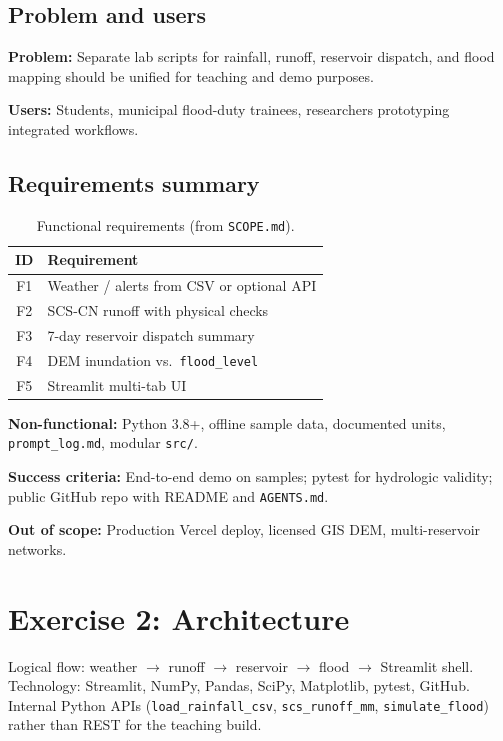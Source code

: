 \documentclass[11pt,a4paper]{article}
\begin{document}
\subsection{Problem and users}
\textbf{Problem:} Separate lab scripts for rainfall, runoff, reservoir dispatch, and flood mapping should be unified for teaching and demo purposes.

\textbf{Users:} Students, municipal flood-duty trainees, researchers prototyping integrated workflows.

\subsection{Requirements summary}
\begin{table}[htbp]
  \centering
  \caption{Functional requirements (from \texttt{SCOPE.md}).}
  \label{tab:func}
  \small
  \begin{tabular}{@{}cl@{}}
    \toprule
    ID & Requirement \\
    \midrule
    F1 & Weather / alerts from CSV or optional API \\
    F2 & SCS-CN runoff with physical checks \\
    F3 & 7-day reservoir dispatch summary \\
    F4 & DEM inundation vs.\ \texttt{flood\_level} \\
    F5 & Streamlit multi-tab UI \\
    \bottomrule
  \end{tabular}
\end{table}

\textbf{Non-functional:} Python 3.8+, offline sample data, documented units, \texttt{prompt\_log.md}, modular \texttt{src/}.

\textbf{Success criteria:} End-to-end demo on samples; pytest for hydrologic validity; public GitHub repo with README and \texttt{AGENTS.md}.

\textbf{Out of scope:} Production Vercel deploy, licensed GIS DEM, multi-reservoir networks.

\section{Exercise 2: Architecture}

Logical flow: weather $\rightarrow$ runoff $\rightarrow$ reservoir $\rightarrow$ flood $\rightarrow$ Streamlit shell. Technology: Streamlit, NumPy, Pandas, SciPy, Matplotlib, pytest, GitHub. Internal Python APIs (\texttt{load\_rainfall\_csv}, \texttt{scs\_runoff\_mm}, \texttt{simulate\_flood}) rather than REST for the teaching build.
\end{document}
